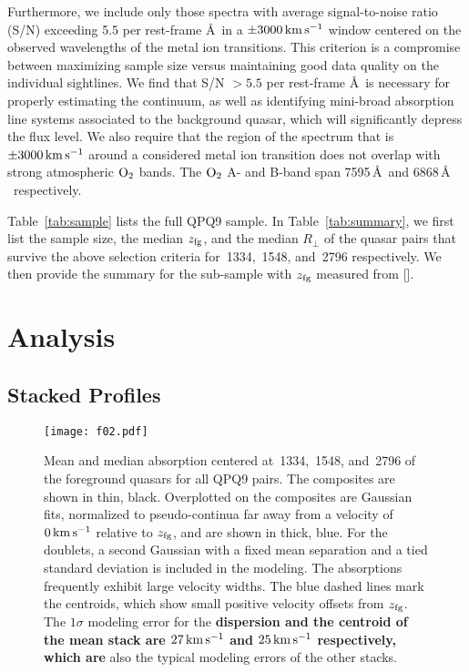 \documentclass[iop]{emulateapj}
\begin{document}
Furthermore, we include only those spectra with average signal-to-noise ratio (S/N) exceeding 5.5
per rest-frame \AA\ in a $\pm3000\,{\rm km\,s^{-1}}$ window centered on the observed wavelengths
of the metal ion transitions. This criterion is a compromise between maximizing sample size versus
maintaining good data quality on the individual sightlines. We find that S/N $>5.5$ per rest-frame
\AA\ is necessary for properly estimating the continuum, as well as identifying mini-broad
absorption line systems associated to the background quasar, which will significantly depress the
flux level. We also require that the region of the spectrum that is $\pm3000\,{\rm km\,s^{-1}}$
around a considered metal ion transition does not overlap with strong atmospheric ${\rm O}_2$
bands. The ${\rm O}_2$ A- and B-band span 7595\,\AA \ and 6868\,\AA
\ respectively.

Table~\ref{tab:sample} lists the full QPQ9 sample. In Table~\ref{tab:summary}, we first list the
sample size, the median $z_{\rm fg}$, and the median $R_\perp$ of the quasar pairs that survive
the above selection criteria for \,1334, \,1548, and \,2796
respectively. We then provide the summary for the sub-sample with $z_{\rm fg}$ measured from
[].

\section{Analysis}
\label{sec:analysis}

\subsection{Stacked Profiles}
\label{sec:stacks}

\begin{figure}
\texttt{[image: f02.pdf]}
\caption{Mean and median absorption centered at \,1334, \,1548, and
\,2796 of the foreground quasars for all QPQ9 pairs. The composites are shown in thin,
black. Overplotted on the composites are Gaussian fits, normalized to pseudo-continua far away
from a velocity of $0\,{\rm km\,s^{-1}}$ relative to $z_{\rm fg}$, and are shown in thick, blue.
For the doublets, a second Gaussian with a fixed mean separation and a tied standard deviation is
included in the modeling. The absorptions frequently exhibit large velocity widths. The blue dashed
lines mark the centroids, which show small positive velocity offsets from $z_{\rm fg}$. The
$1\sigma$ modeling error for the
{\bf dispersion and the centroid of the  mean stack are $27\,{\rm km\,s^{-1}}$ and
$25\,{\rm km\,s^{-1}}$ respectively, which are}
also the typical modeling errors of the other stacks.
}
\label{fig:stacks_and_fits}
\end{figure}
\end{document}
